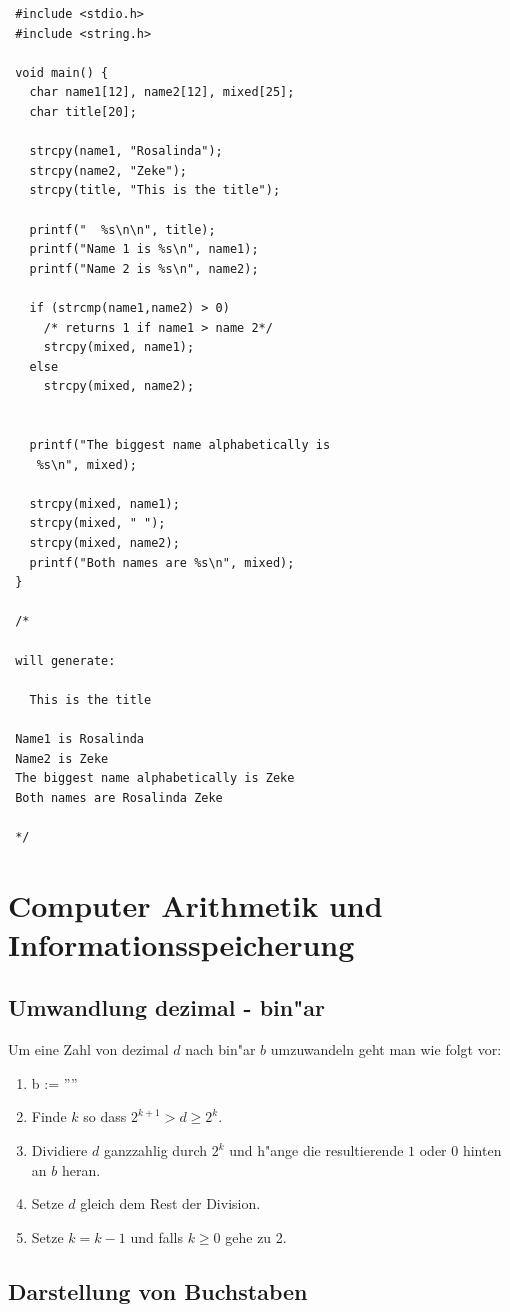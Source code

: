 \documentclass[german, 10pt, a4paper, twocolumn]{scrartcl}
\begin{document}
\begin{verbatim}
 #include <stdio.h>
 #include <string.h>

 void main() {
   char name1[12], name2[12], mixed[25];
   char title[20];

   strcpy(name1, "Rosalinda");
   strcpy(name2, "Zeke");
   strcpy(title, "This is the title");

   printf("  %s\n\n", title);
   printf("Name 1 is %s\n", name1);
   printf("Name 2 is %s\n", name2);

   if (strcmp(name1,name2) > 0)
     /* returns 1 if name1 > name 2*/
     strcpy(mixed, name1);
   else
     strcpy(mixed, name2);


   printf("The biggest name alphabetically is
    %s\n", mixed);

   strcpy(mixed, name1);
   strcpy(mixed, " ");
   strcpy(mixed, name2);
   printf("Both names are %s\n", mixed);
 }

 /*
 
 will generate:

   This is the title
 
 Name1 is Rosalinda
 Name2 is Zeke
 The biggest name alphabetically is Zeke
 Both names are Rosalinda Zeke
 
 */
\end{verbatim}

\section{Computer Arithmetik und Informationsspeicherung}

\subsection{Umwandlung dezimal - bin"ar}

Um eine Zahl von dezimal $d$ nach bin"ar $b$ umzuwandeln geht man wie folgt vor:
\begin{enumerate}
	\item b := ''''
	\item Finde $k$ so dass $2^{k+1}> d \geq 2^{k}$.
	\item Dividiere $d$ ganzzahlig durch $2^k$ und h"ange die resultierende $1$ oder $0$ hinten an $b$ heran.
	\item Setze $d$ gleich dem Rest der Division.
	\item Setze $k=k-1$ und falls $k \geq 0$ gehe zu 2.
\end{enumerate}

\subsection{Darstellung von Buchstaben}
\end{document}
